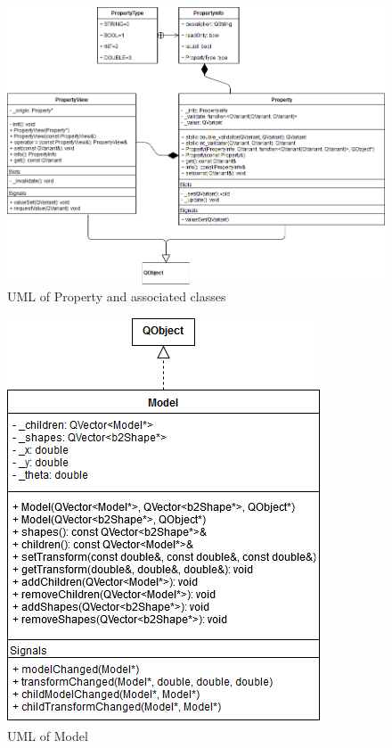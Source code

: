  \begin{figure}
 	\begin{center}
 	\includegraphics[scale=0.5]{./images_design/uml/Property}
 	\caption{UML of Property and associated classes\label{uml:property}}
 	\end{center}
 \end{figure} 
 
 \begin{figure}
 	\begin{center}
 	\includegraphics[scale=0.5]{./images_design/uml/Model}
 	\caption{UML of Model\label{uml:model}}
 	\end{center}
 \end{figure} 
 
